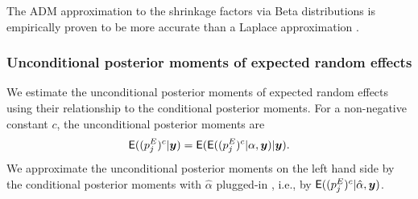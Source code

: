 \documentclass[article]{jss}
\begin{document}
The ADM approximation to the shrinkage factors via Beta distributions is empirically proven to be more accurate than a Laplace approximation \citep{carl1988, morris1997, tang2011, morris2012}.




\subsubsection{Unconditional posterior moments of expected random effects}
We estimate the unconditional posterior moments of expected random effects using their relationship to the conditional posterior moments. For a non-negative constant $c$, the unconditional posterior moments are
\begin{equation}
\mathsf{E}((p^E_j)^c\vert\boldsymbol{y})=\mathsf{E}(\mathsf{E}((p^E_j)^c\vert \alpha, \boldsymbol{y})\vert\boldsymbol{y}).
\end{equation}
We approximate the unconditional posterior moments on the left hand side by the conditional posterior moments with $\hat{\alpha}$ plugged-in \citep{kass1989approximate}, i.e., by $\mathsf{E}((p^E_j)^c\vert \hat{\alpha}, \boldsymbol{y})$.
\end{document}
